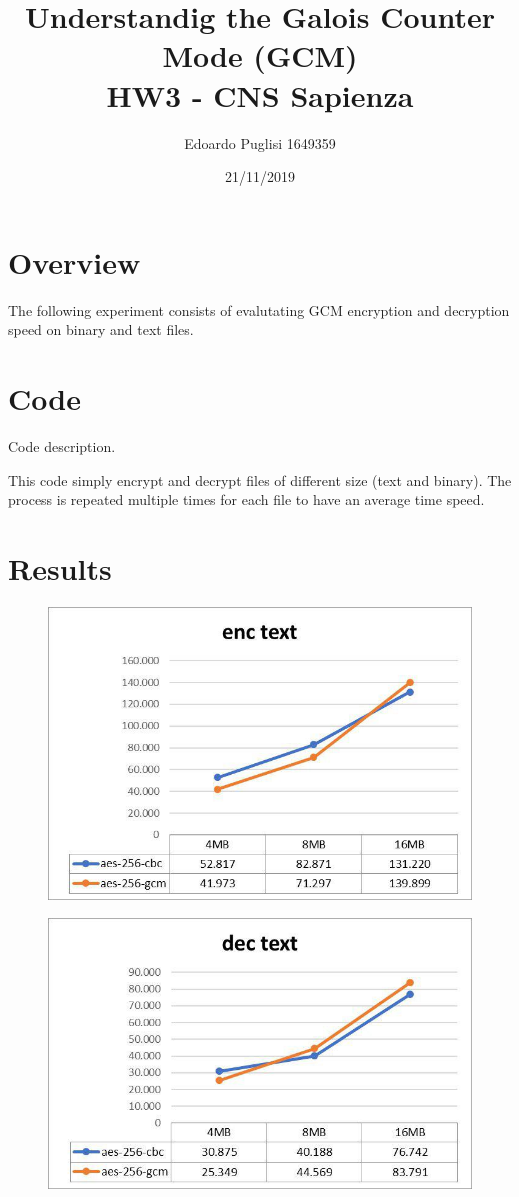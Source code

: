 \documentclass[11pt,a4paper]{article}
\title{Understandig the Galois Counter Mode (GCM) \\ HW3 - CNS Sapienza}
\author{Edoardo Puglisi 1649359}
\date{21/11/2019}
\begin{document}
\lstset{breaklines=true}
	
\maketitle
\tableofcontents
\clearpage

\section{Overview}
The following experiment consists of evalutating GCM encryption and decryption speed on binary and text files.

\section{Code}
Code description.

This code simply encrypt and decrypt files of different size (text and binary). The process is repeated multiple times for each file to have an average time speed.


\section{Results}
\begin{figure}[H]
    \centering
        \includegraphics[width=\textwidth]{et-hw3-1649359.jpg}
\end{figure}
\begin{figure}[H]
    \centering
        \includegraphics[width=\textwidth]{dt-hw3-1649359.jpg}
\end{figure}
\end{document}
